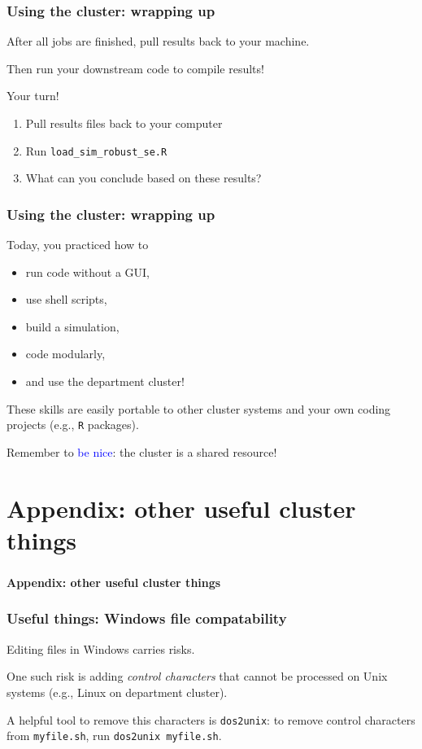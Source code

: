 \documentclass[12pt, 
hyperref={colorlinks=true, linkcolor=BlueViolet, urlcolor=BlueViolet},dvipsnames]{beamer}
\begin{document}
\begin{frame}
\frametitle{Using the cluster: wrapping up}
After all jobs are finished, pull results back to your machine. \pause

Then run your downstream code to compile results! \pause

Your turn! \vspace{-0.3cm}
\begin{enumerate}
\item Pull results files back to your computer
\item Run \texttt{load\_sim\_robust\_se.R}
\item What can you conclude based on these results?
\end{enumerate}
\end{frame}

\begin{frame}
\frametitle{Using the cluster: wrapping up}
Today, you practiced how to \vspace{-0.3cm} \pause
\begin{itemize}
\item run code without a GUI, \pause
\item use shell scripts, \pause
\item build a simulation, \pause
\item code modularly, \pause
\item and use the department cluster! \pause
\end{itemize}

These skills are easily portable to other cluster systems and your own coding projects (e.g., \texttt{R} packages). \pause

Remember to \textcolor{blue}{be nice}: the cluster is a shared resource!

\end{frame}

\section*{Appendix: other useful cluster things}
\begin{frame}
\frametitle{}
\begin{center}
{\large \textbf{Appendix: other useful cluster things}}
\end{center}
\end{frame}
\begin{frame}
\frametitle{Useful things: Windows file compatability}
Editing files in Windows carries risks. 

One such risk is adding \textit{control characters} that cannot be processed on Unix systems (e.g., Linux on department cluster).

A helpful tool to remove this characters is \texttt{dos2unix}: to remove control characters from \texttt{myfile.sh}, run \texttt{dos2unix myfile.sh}.
\end{frame}
\end{document}
